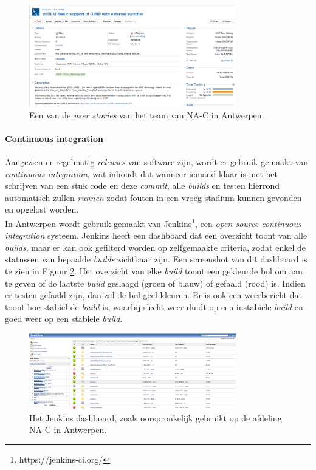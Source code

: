 \documentclass[10pt,a4paper]{article}
\begin{document}
\begin{figure}[ht!]
\centering
\includegraphics[width=90mm]{user_story.png}
\caption{Een van de \textit{user stories} van het team van NA-C in Antwerpen.} 
\label{user_story}
\end{figure}

\paragraph{Continuous integration}
Aangezien er regelmatig \textit{releases} van software zijn, wordt er gebruik gemaakt van \textit{continuous integration}, wat inhoudt dat wanneer iemand klaar is met het schrijven van een stuk code en deze \textit{commit}, alle \textit{builds} en testen hierrond automatisch zullen \textit{runnen} zodat fouten in een vroeg stadium kunnen gevonden en opgelost worden.\\
In Antwerpen wordt gebruik gemaakt van Jenkins\footnote{https://jenkins-ci.org/}, een \textit{open-source continuous integration} systeem. Jenkins heeft een dashboard dat een overzicht toont van alle \textit{builds}, maar er kan ook gefilterd worden op zelfgemaakte criteria, zodat enkel de statussen van bepaalde \textit{builds} zichtbaar zijn. Een screenshot  van dit dashboard is te zien in Figuur \ref{jenkins_orig}. Het overzicht van elke \textit{build} toont een gekleurde bol om aan te geven of de laatste \textit{build} geslaagd (groen of blauw) of gefaald (rood) is. Indien er testen gefaald zijn, dan zal de bol geel kleuren.
Er is ook een weerbericht dat toont hoe stabiel de \textit{build} is, waarbij slecht weer duidt op een instabiele \textit{build} en goed weer op een stabiele \textit{build}. 

\begin{figure}[ht!]
\centering
\includegraphics[width=90mm]{CaptureJenkins.png}
\caption{Het Jenkins dashboard, zoals oorspronkelijk gebruikt op de afdeling NA-C in Antwerpen.} 
\label{jenkins_orig}
\end{figure}
\end{document}

